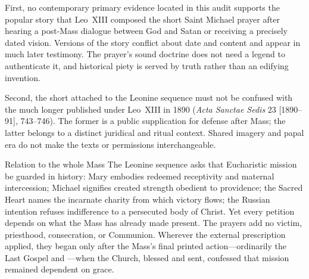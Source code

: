 First, no contemporary primary evidence located in this audit supports the popular story that Leo~XIII composed the short Saint Michael prayer after hearing a post-Mass dialogue between God and Satan or receiving a precisely dated vision. Versions of the story conflict about date and content and appear in much later testimony. The prayer's sound doctrine does not need a legend to authenticate it, and historical piety is served by truth rather than an edifying invention.

Second, the short  attached to the Leonine sequence must not be confused with the much longer  published under Leo~XIII in 1890 (\emph{Acta Sanctae Sedis} 23 [1890--91], 743--746). The former is a public supplication for defense after Mass; the latter belongs to a distinct juridical and ritual context. Shared imagery and papal era do not make the texts or permissions interchangeable.

\begin{studybox}{Relation to the whole Mass}
The Leonine sequence asks that Eucharistic mission be guarded in history: Mary embodies redeemed receptivity and maternal intercession; Michael signifies created strength obedient to providence; the Sacred Heart names the incarnate charity from which victory flows; the Russian intention refuses indifference to a persecuted body of Christ. Yet every petition depends on what the Mass has already made present. The prayers add no victim, priesthood, consecration, or Communion. Wherever the external prescription applied, they began only after the Mass's final printed action---ordinarily the Last Gospel and ---when the Church, blessed and sent, confessed that mission remained dependent on grace.
\end{studybox}
